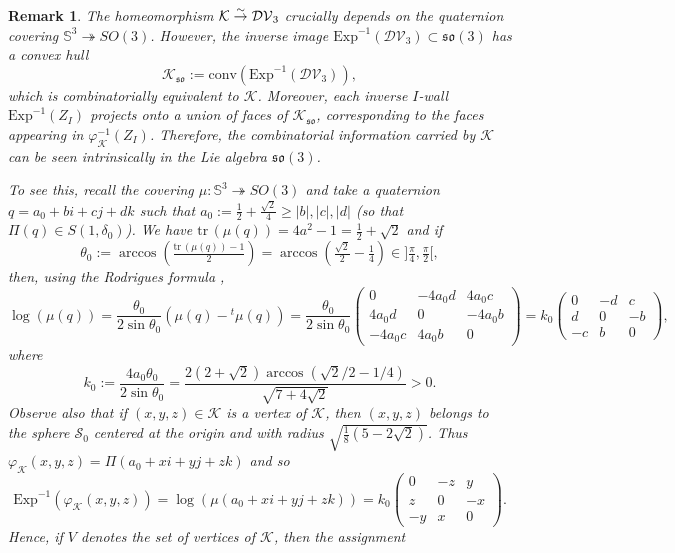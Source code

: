 \documentclass[11pt,twoside]{amsart}
\theoremstyle{plain}
\newtheorem{rem}[prop]{Remark}
\newcommand{\Sph}{\mathbb{S}}
\newcommand{\tr}{\mathrm{tr}\,}
\begin{document}
\begin{rem}
The homeomorphism $\mathcal{K}\stackrel{\tiny{\sim}}\to\mathcal{DV}_3$ crucially depends on the quaternion covering $\Sph^3\twoheadrightarrow SO(3)$. However, the inverse image $\mathrm{Exp}^{-1}(\mathcal{DV}_3)\subset\mathfrak{so}(3)$ has a convex hull
\[\mathcal{K}_{\mathfrak{so}}:=\mathrm{conv}(\mathrm{Exp}^{-1}(\mathcal{DV}_3)),\]
which is combinatorially equivalent to $\mathcal{K}$. Moreover, each inverse $I$-wall $\mathrm{Exp}^{-1}(Z_I)$ projects onto a union of faces of $\mathcal{K}_{\mathfrak{so}}$, corresponding to the faces appearing in $\varphi_{\mathcal{K}}^{-1}(Z_I)$. Therefore, the combinatorial information carried by $\mathcal{K}$ can be seen intrinsically in the Lie algebra $\mathfrak{so}(3)$.

To see this, recall the covering $\mu : \Sph^3\twoheadrightarrow SO(3)$ and take a quaternion $q=a_0+bi+cj+dk$ such that $a_0:=\tfrac12+\tfrac{\sqrt{2}}{4}\ge |b|,|c|,|d|$ (so that $\Pi(q)\in S(1,\delta_0)$). We have $\tr(\mu(q))=4a^2-1=\tfrac12+\sqrt{2}$ and if 
\[\theta_0:=\arccos\left(\tfrac{\tr(\mu(q))-1}{2}\right)=\arccos\left(\tfrac{\sqrt{2}}{2}-\tfrac14\right)\in]\tfrac\pi4,\tfrac\pi2[,\]
then, using the \textit{Rodrigues formula} \cite[\S 2]{log_rotations},
\[\log(\mu(q))=\frac{\theta_0}{2\sin\theta_0}\left(\mu(q)-{}^t{\mu(q)}\right)=\frac{\theta_0}{2\sin\theta_0}\begin{pmatrix}0 & -4a_0d & 4a_0c \\ 4a_0d & 0 & -4a_0b \\ -4a_0c & 4a_0b & 0\end{pmatrix}=k_0\begin{pmatrix}0 & -d & c \\ d & 0 & -b \\ -c & b & 0\end{pmatrix},\]
where
\[k_0:=\frac{4a_0\theta_0}{2\sin\theta_0}=\frac{2(2+\sqrt{2})\arccos(\sqrt{2}/2-1/4)}{\sqrt{7+4\sqrt{2}}}>0.\]
Observe also that if $(x,y,z)\in\mathcal{K}$ is a vertex of $\mathcal{K}$, then $(x,y,z)$ belongs to the sphere $\mathcal{S}_0$ centered at the origin and with radius $\sqrt{\tfrac18(5-2\sqrt{2})}$. Thus $\varphi_{\mathcal{K}}(x,y,z)=\Pi(a_0+xi+yj+zk)$ and so
\[\mathrm{Exp}^{-1}(\varphi_{\mathcal{K}}(x,y,z))=\log(\mu(a_0+xi+yj+zk))=k_0\begin{pmatrix}0 & -z & y \\ z & 0 & -x \\ -y & x & 0\end{pmatrix}.\]
Hence, if $V$ denotes the set of vertices of $\mathcal{K}$, then the assignment

\end{rem}
\end{document}
